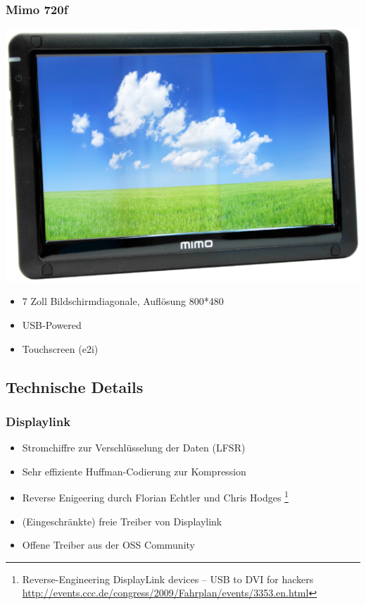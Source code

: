 \documentclass{beamer}
\begin{document}
	\begin{frame}
		\frametitle{Mimo 720f}
		\begin{center}
			\includegraphics[scale=0.3]{img/mimo720f}
		\end{center}
		
		\begin{itemize}
			\item 7 Zoll Bildschirmdiagonale, Auflösung 800*480
			\item USB-Powered
			\item Touchscreen (e2i)
		\end{itemize}
	\end{frame}

  \subsection{Technische Details}
	\begin{frame}
		\frametitle{Displaylink}
		\begin{itemize}
			\item Stromchiffre zur Verschlüsselung der Daten (LFSR)
			\item Sehr effiziente Huffman-Codierung zur Kompression
			\item Reverse Enigeering durch Florian Echtler und Chris Hodges \footnote{Reverse-Engineering DisplayLink devices -- USB to DVI for hackers \url{http://events.ccc.de/congress/2009/Fahrplan/events/3353.en.html}}
			\item (Eingeschränkte) freie Treiber von Displaylink
			\item Offene Treiber aus der OSS Community
		\end{itemize}
	\end{frame}	
	
\end{document}
